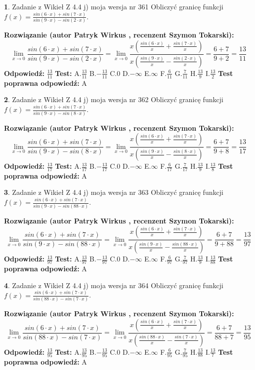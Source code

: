 \documentclass[12pt, a4paper]{article}
\theoremstyle{definition} %
\newtheorem{zad}{}
\newcommand{\zadStart}[1]{\begin{zad}#1\newline}
\newcommand{\zadStop}{\end{zad}}
\newcommand{\rozwStart}[2]{\noindent \textbf{Rozwiązanie (autor #1 , recenzent #2): }\newline}
\newcommand{\rozwStop}{\newline}
\newcommand{\odpStart}{\noindent \textbf{Odpowiedź:}\newline}
\newcommand{\odpStop}{\newline}
\newcommand{\testStart}{\noindent \textbf{Test:}\newline}
\newcommand{\testStop}{\newline}
\newcommand{\kluczStart}{\noindent \textbf{Test poprawna odpowiedź:}\newline}
\newcommand{\kluczStop}{\newline}
\begin{document}
\zadStart{Zadanie z Wikieł Z 4.4 j) moja wersja nr 361}
Obliczyć granicę funkcji $f(x)=\frac{sin(6\cdot x) +sin(7\cdot x)}{sin(9\cdot x) -sin(2\cdot x)}$.
\zadStop
\rozwStart{Patryk Wirkus}{Szymon Tokarski}
$$\lim\limits_{x\to 0}\frac{sin(6\cdot x) +sin(7\cdot x)}{sin(9\cdot x) -sin(2\cdot x)}=\lim\limits_{x\to 0}\frac{x(\frac{sin(6\cdot x)}{x}+\frac{sin(7\cdot x)}{x})}{x(\frac{sin(9\cdot x)}{x}-\frac{sin(2\cdot x)}{x})}=\frac{6+7}{9+2} = \frac{13}{11}$$
\rozwStop
\odpStart
$\frac{13}{11}$
\odpStop
\testStart
A.$\frac{13}{11}$
B.$-\frac{13}{11}$
C.$0$
D.$-\infty$
E.$\infty$
F.$\frac{6}{11}$
G.$\frac{7}{11}$
H.$\frac{13}{9}$
I.$\frac{13}{2}$
\testStop
\kluczStart
A
\kluczStop



\zadStart{Zadanie z Wikieł Z 4.4 j) moja wersja nr 362}
Obliczyć granicę funkcji $f(x)=\frac{sin(6\cdot x) +sin(7\cdot x)}{sin(9\cdot x) -sin(8\cdot x)}$.
\zadStop
\rozwStart{Patryk Wirkus}{Szymon Tokarski}
$$\lim\limits_{x\to 0}\frac{sin(6\cdot x) +sin(7\cdot x)}{sin(9\cdot x) -sin(8\cdot x)}=\lim\limits_{x\to 0}\frac{x(\frac{sin(6\cdot x)}{x}+\frac{sin(7\cdot x)}{x})}{x(\frac{sin(9\cdot x)}{x}-\frac{sin(8\cdot x)}{x})}=\frac{6+7}{9+8} = \frac{13}{17}$$
\rozwStop
\odpStart
$\frac{13}{17}$
\odpStop
\testStart
A.$\frac{13}{17}$
B.$-\frac{13}{17}$
C.$0$
D.$-\infty$
E.$\infty$
F.$\frac{6}{17}$
G.$\frac{7}{17}$
H.$\frac{13}{9}$
I.$\frac{13}{8}$
\testStop
\kluczStart
A
\kluczStop



\zadStart{Zadanie z Wikieł Z 4.4 j) moja wersja nr 363}
Obliczyć granicę funkcji $f(x)=\frac{sin(6\cdot x) +sin(7\cdot x)}{sin(9\cdot x) -sin(88\cdot x)}$.
\zadStop
\rozwStart{Patryk Wirkus}{Szymon Tokarski}
$$\lim\limits_{x\to 0}\frac{sin(6\cdot x) +sin(7\cdot x)}{sin(9\cdot x) -sin(88\cdot x)}=\lim\limits_{x\to 0}\frac{x(\frac{sin(6\cdot x)}{x}+\frac{sin(7\cdot x)}{x})}{x(\frac{sin(9\cdot x)}{x}-\frac{sin(88\cdot x)}{x})}=\frac{6+7}{9+88} = \frac{13}{97}$$
\rozwStop
\odpStart
$\frac{13}{97}$
\odpStop
\testStart
A.$\frac{13}{97}$
B.$-\frac{13}{97}$
C.$0$
D.$-\infty$
E.$\infty$
F.$\frac{6}{97}$
G.$\frac{7}{97}$
H.$\frac{13}{9}$
I.$\frac{13}{88}$
\testStop
\kluczStart
A
\kluczStop



\zadStart{Zadanie z Wikieł Z 4.4 j) moja wersja nr 364}
Obliczyć granicę funkcji $f(x)=\frac{sin(6\cdot x) +sin(7\cdot x)}{sin(88\cdot x) -sin(7\cdot x)}$.
\zadStop
\rozwStart{Patryk Wirkus}{Szymon Tokarski}
$$\lim\limits_{x\to 0}\frac{sin(6\cdot x) +sin(7\cdot x)}{sin(88\cdot x) -sin(7\cdot x)}=\lim\limits_{x\to 0}\frac{x(\frac{sin(6\cdot x)}{x}+\frac{sin(7\cdot x)}{x})}{x(\frac{sin(88\cdot x)}{x}-\frac{sin(7\cdot x)}{x})}=\frac{6+7}{88+7} = \frac{13}{95}$$
\rozwStop
\odpStart
$\frac{13}{95}$
\odpStop
\testStart
A.$\frac{13}{95}$
B.$-\frac{13}{95}$
C.$0$
D.$-\infty$
E.$\infty$
F.$\frac{6}{95}$
G.$\frac{7}{95}$
H.$\frac{13}{88}$
I.$\frac{13}{7}$
\testStop
\kluczStart
A
\kluczStop
\end{document}

